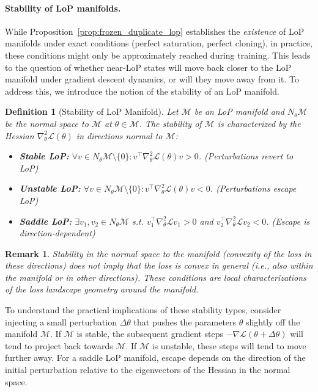 \documentclass{article}
\newcommand{\Loss}{\mathcal{L}}
\newcommand{\GIU}[1]{\todo[color=purple!30,size=\tiny]{GIU: #1}}
\newtheorem{definition}{Definition}[section]
\newtheorem{remark}{Remark}[section]
\numberwithin{figure}{section}
\begin{document}
\paragraph{Stability of LoP manifolds.}
While Proposition~\ref{prop:frozen_duplicate_lop} establishes the \emph{existence} of LoP manifolds under exact conditions (perfect saturation, perfect cloning), in practice, these conditions might only be approximately reached during training. This leads to the question of whether  near-LoP states will move back closer to the LoP manifold under gradient descent dynamics, or will they move away from it. To address this, we introduce the notion of the stability of an LoP manifold.

\begin{definition}[Stability of LoP Manifold]
\label{def:lop_stability_main}
Let $\mathcal{M}$ be an LoP manifold and $N_\theta\mathcal{M}$ be the normal space to $\mathcal{M}$ at $\theta \in \mathcal{M}$. The stability of $\mathcal{M}$ is characterized by the Hessian $\nabla_\theta^2\Loss(\theta)$ in directions normal to $\mathcal{M}$:
\begin{itemize}
    \item \textbf{Stable LoP:} $\forall v\in N_\theta\mathcal{M}\setminus\{0\}: v^\top\nabla_\theta^2\Loss(\theta)v > 0$. (Perturbations revert to LoP)
    \item \textbf{Unstable LoP:} $\forall v\in N_\theta\mathcal{M}\setminus\{0\}: v^\top\nabla_\theta^2\Loss(\theta)v < 0$. (Perturbations  escape LoP)
    \item \textbf{Saddle LoP:} $\exists v_1,v_2\in N_\theta\mathcal{M}$ s.t. $v_1^\top\nabla_\theta^2\Loss v_1>0$ and $v_2^\top\nabla_\theta^2\Loss v_2<0$. (Escape is direction-dependent)
\end{itemize}
\end{definition}

\begin{remark}
Stability in the normal space to the manifold (convexity of the loss in these directions) does not imply that the loss is convex in general (i.e., also within the manifold or in other directions). These conditions are local characterizations of the loss landscape geometry around the manifold.
\end{remark}

To understand the practical implications of these stability types, consider injecting a small perturbation $\Delta\theta$ that pushes the parameters $\theta$ slightly off the manifold $\mathcal{M}$. If $\mathcal{M}$ is stable, the subsequent gradient steps $-\nabla \Loss(\theta+\Delta\theta)$ will tend to project back towards $\mathcal{M}$. If $\mathcal{M}$ is unstable, these steps will tend to move further away. For a saddle LoP manifold, escape depends on the direction of the initial perturbation relative to the eigenvectors of the Hessian in the normal space.
\end{document}

